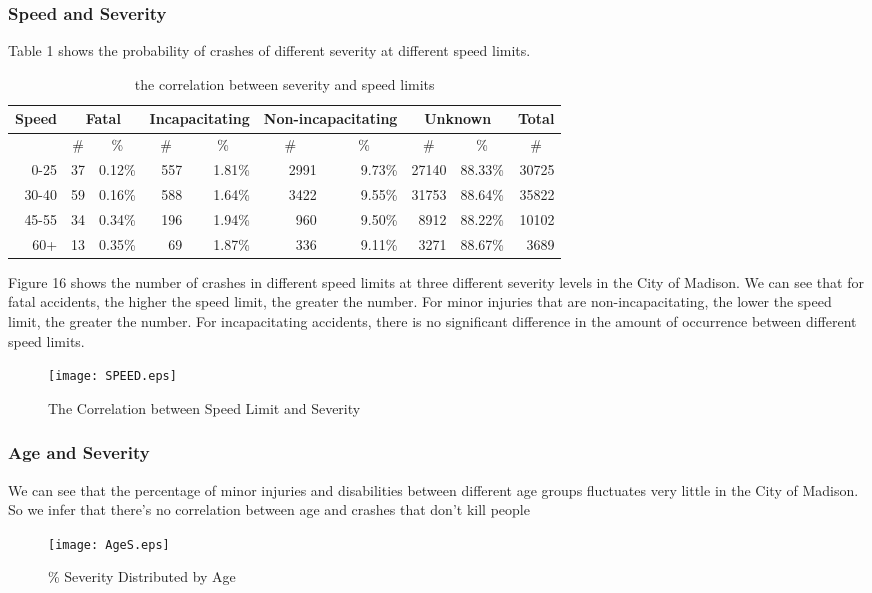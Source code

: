 \documentclass[15pt]{article}
\begin{document}
\subsubsection{Speed and Severity}
Table 1 shows the probability of crashes of different severity at different speed limits.

\begin{table}[htbp]
  \centering
  \caption{the correlation between severity and speed limits}
    \begin{tabular}{rrrrrrrrrr}
    \multicolumn{1}{l}{Speed} & \multicolumn{2}{c}{Fatal} & \multicolumn{2}{c}{Incapacitating} & \multicolumn{2}{c}{Non-incapacitating} & \multicolumn{2}{c}{Unknown} & \multicolumn{1}{l}{Total} \\
    \hline
          & \multicolumn{1}{c}{\#} & \multicolumn{1}{c}{\%} & \multicolumn{1}{c}{\#} & \multicolumn{1}{c}{\%} & \multicolumn{1}{c}{\#} & \multicolumn{1}{c}{\%} & \multicolumn{1}{c}{\#} & \multicolumn{1}{c}{\%} & \multicolumn{1}{c}{\#} \\
    \hline
    0-25   & 37    & 0.12\% & 557   & 1.81\% & 2991  & 9.73\% & 27140 & 88.33\% & 30725 \\
    30-40 & 59    & 0.16\% & 588   & 1.64\% & 3422  & 9.55\% & 31753 & 88.64\% & 35822 \\
    45-55 & 34    & 0.34\% & 196   & 1.94\% & 960   & 9.50\% & 8912  & 88.22\% & 10102 \\
    60+   & 13    & 0.35\% & 69    & 1.87\% & 336   & 9.11\% & 3271  & 88.67\% & 3689 \\
    \hline
    \end{tabular}%
  \label{tab:addlabel}%
\end{table}%

Figure 16 shows the number of crashes in different speed limits at three different severity levels in the City of Madison. We can see that for fatal accidents, the higher the speed limit, the greater the number. For minor injuries that are non-incapacitating, the lower the speed limit, the greater the number. For incapacitating accidents, there is no significant difference in the amount of occurrence between different speed limits.
\begin{figure}[H]
\flushleft
\texttt{[image: SPEED.eps]}
\caption{The Correlation between Speed Limit and Severity}
\label{18}
\end{figure}

\newpage
\subsubsection{Age and Severity}
We can see that the percentage of minor injuries and disabilities between different age groups fluctuates very little in the City of Madison. So we infer that there's no correlation between age and crashes that don't kill people
\begin{figure}[H]
\flushleft
\texttt{[image: AgeS.eps]}
\caption{\% Severity Distributed by Age}
\label{19}
\end{figure}
\end{document}
